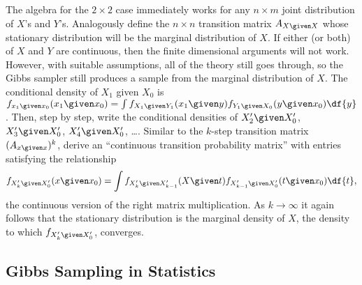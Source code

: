 \documentclass[12pt]{article}
\begin{document}
The algebra for the \( 2 \times 2 \) case immediately works for any \( n
\times m \) joint distribution of \( X \)'s and \( Y \)'s. Analogously
define the \( n \times n \) transition matrix \( A_{X \given X} \) whose
stationary distribution will be the marginal distribution of \( X \).
If either (or both) of \( X \) and \( Y \) are continuous, then the
finite dimensional arguments will not work.  However, with suitable
assumptions, all of the theory still goes through, so the Gibbs sampler
still produces a sample from the marginal distribution of \( X \). The
conditional density of \( X_1 \) given \( X_0 \) is \( f_{x_1 \given x_0}
(x_1 \given x_0) = \int f_{X_1 \given Y_1}(x_1 \given y)f_{Y_1 \given X_0}
(y \given x_0) \df{y} \). Then, step by step, write the conditional
densities of \( X'_2 \given X'_0 \), \( X'_3 \given X'_0 \), \( X'_4
\given X'_0 \), \dots.  Similar to the \( k \)-step transition matrix \(
(A_{x \given x})^k \), derive an ``continuous transition probability
matrix'' with entries satisfying the relationship
\[
    f_{X'_k \given X'_0}(x \given x_0 ) = \int f_{X'_k \given X'_{k-1}}
    (X \given t) f_{X'_{k-1} \given X'_{0}}(t \given x_0) \df{t},
\] the continuous version of the right matrix multiplication. As \( k
\to \infty \) it again follows that the stationary distribution is the
marginal density of \( X \), the density to which \( f_{X'_k \given X'_0}
\), converges.

\subsection*{Gibbs Sampling in Statistics}
\end{document}
